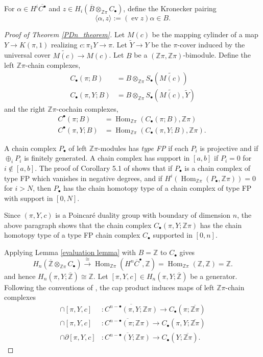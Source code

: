 \documentclass[12pt]{amsart}
\theoremstyle{definition}
\newcommand{\Z}{\mathbb Z}
\DeclareMathOperator{\ev}{ev}
\DeclareMathOperator{\Hom}{Hom}
\newcommand{\ol}[1]{{\overline{#1}}}
\newcommand{\wt}[1]{{\widetilde{#1}}}
\begin{document}
For $\alpha \in H^i\ol{C^\bullet}$ and $z \in H_i(\ol B \otimes_{\Z\pi}  C_\bullet)$, define the Kronecker pairing 
$$
\langle \alpha, z \rangle := (\ev z) \alpha  \in B.
$$



\begin{proof}[Proof of Theorem \ref{PDn_theorem}]  


Let $M(c)$ be the mapping cylinder of a map $Y \to K(\pi,1)$ realizing $c : \pi_1Y \to \pi$.  Let $\wt Y \to Y$ be the  $\pi$-cover induced by the universal cover $\wt{M(c)} \to M(c)$.
Let $B$ be a $(\Z\pi,\Z\pi)$-bimodule.   Define the left $\Z\pi$-chain complexes,
\begin{align*}
C_\bullet(\pi;B) & = B \otimes_{\Z\pi} S_\bullet(\wt{M(c)})\\
C_\bullet(\pi,Y;B) & = B \otimes_{\Z\pi} S_\bullet(\wt{M(c)},\wt Y)
\end{align*}
and the right $\Z\pi$-cochain complexes,
\begin{align*}
C^\bullet(\pi;B) & = \Hom_{\Z\pi}(C_\bullet(\pi;B) ,\Z\pi)\\
C^\bullet(\pi,Y;B) & =\Hom_{\Z\pi}(C_\bullet(\pi,Y;B) ,\Z\pi).\ 
\end{align*}





A chain complex $P_\bullet$ of left $\Z\pi$-modules has {\em type FP} if each $P_i$ is projective and if $\oplus_i P_i$ is finitely generated.  A chain complex has support in $[a,b]$ if $P_i = 0$ for $i \not \in [a,b]$.     The proof of Corollary 5.1 of \cite{Wall_FII} shows that if $P_\bullet$ is a chain complex of type FP which vanishes in negative degrees, and if $H^i(\Hom_{\Z\pi}(P_\bullet,\Z\pi)) = 0$ for $i > N$, then $P_\bullet$ has the chain homotopy type of a chain complex of type FP with support in $[0,N]$. 


Since $(\pi,Y,c)$ is a Poincar\'e duality group with boundary of dimension $n$, the above paragraph shows that the chain complex $C_\bullet(\pi,Y;\Z\pi)$ has the chain homotopy type of a type FP  chain complex $C_\bullet$ supported in $[0,n]$.

Applying  Lemma \ref{evaluation lemma} with $B = \Z$  to $C_\bullet$ gives
\[
 H_n(\ol\Z \otimes_{\Z\pi} C_\bullet) \xrightarrow{\cong} \Hom_{\Z\pi}(H^n\ol C^\bullet, \Z) = \Hom_{\Z\pi}(\Z, \Z)
= \mathbb{Z}.
\]
and hence
$H_n(\pi,Y;\ol\Z)\cong \Z$. 
Let $[\pi,Y,c] \in H_n(\pi,Y;\ol \Z)$ be a generator.   Following the conventions of \cite{Hi20},  the cap product induces maps of left $\Z\pi$-chain complexes
\begin{align*}
 \cap[\pi,Y,c] & : \ol{C^{n-\bullet}(\pi,Y; \Z\pi )} \to  C_\bullet(\pi; \ol{\Z\pi}) \\
  \cap[\pi,Y,c] & : \ol{C^{n-\bullet}(\pi; \Z\pi )} \to  C_\bullet(\pi,Y; \ol{\Z\pi}) \\
    \cap\partial [\pi,Y,c] & : \ol{C^{n-\bullet}(Y; \Z\pi )} \to  C_\bullet(Y; \ol{\Z\pi}).
\end{align*}


\end{proof}
\end{document}
